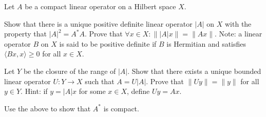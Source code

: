 Let $A$ be a compact linear operator on a Hilbert space $X$.
\begin{alist}
\item Show that there is a unique positive definite linear operator
$|A|$ on $X$ with the property that $|A|^2=A^*A$. Prove that $\forall
x\in X:\| |A|x\|=\|Ax\|$. Note: a linear operator $B$ on $X$ is said
to be positive definite if $B$ is Hermitian and satisfies $\langle
Bx,x \rangle\geq 0$ for all $x\in X$.
\item Let $Y$ be the closure of the range of $|A|$. Show that there
exists a unique bounded linear operator $U:Y\rightarrow X$ such that
$A=U|A|$. Prove that $\|Uy\|=\|y\|$ for all $y\in Y$. Hint: if
$y=|A|x$ for some $x\in X$, define $Uy=Ax$.
\item Use the above to show that $A^*$ is compact.
\end{alist}
